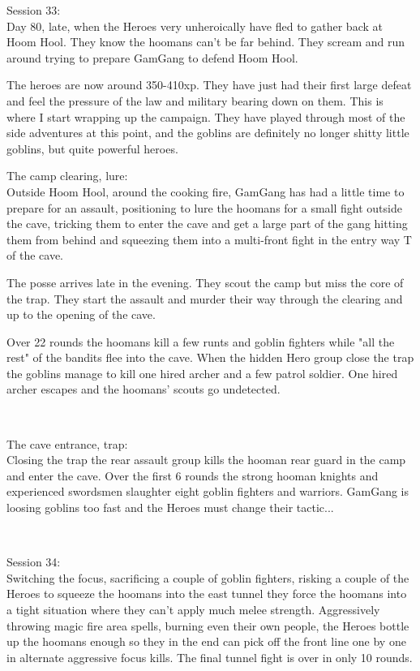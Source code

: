 \forceindent Session 33:\\                                              %
Day 80, late, when the Heroes very unheroically have fled to gather back at Hoom Hool. They know the hoomans can't be far behind. They scream and run around trying to prepare GamGang to defend Hoom Hool.

\begin{readoutloud}
The heroes are now around 350-410xp. They have just had their first large defeat and feel the pressure of the law and military bearing down on them. This is where I start wrapping up the campaign. They have played through most of the side adventures at this point, and the goblins are definitely no longer shitty little goblins, but quite powerful heroes.
\end{readoutloud}

The camp clearing, lure:\\
Outside Hoom Hool, around the cooking fire, GamGang has had a little time to prepare for an assault, positioning to lure the hoomans for a small fight outside the cave, tricking them to enter the cave and get a large part of the gang hitting them from behind and squeezing them into a multi-front fight in the entry way T of the cave.

The posse arrives late in the evening. They scout the camp but miss the core of the trap. They start the assault and murder their way through the clearing and up to the opening of the cave. 

Over 22 rounds the hoomans kill a few runts and goblin fighters while "all the rest" of the bandits flee into the cave. When the hidden Hero group close the trap the goblins manage to kill one hired archer and a few patrol soldier. One hired archer escapes and the hoomans' scouts go undetected.

\

The cave entrance, trap:\\
Closing the trap the rear assault group kills the hooman rear guard in the camp and enter the cave. Over the first 6 rounds the strong hooman knights and experienced swordsmen slaughter eight goblin fighters and warriors. GamGang is loosing goblins too fast and the Heroes must change their tactic...

\

Session 34:\\                                                           %
Switching the focus, sacrificing a couple of goblin fighters, risking a couple of the Heroes to squeeze the hoomans into the east tunnel they force the hoomans into a tight situation where they can't apply much melee strength. Aggressively throwing magic fire area spells, burning even their own people, the Heroes bottle up the hoomans enough so they in the end can pick off the front line one by one in alternate aggressive focus kills. The final tunnel fight is over in only 10 rounds.

